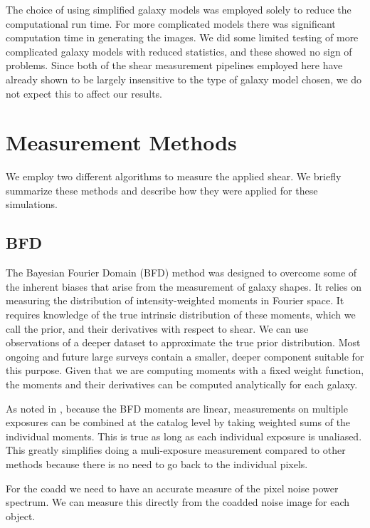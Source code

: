 \documentclass[fleqn,useAMS,usenatbib]{mnras}
\begin{document}
The choice of using simplified galaxy models was employed solely to reduce the computational run time.  For more complicated models there was significant computation time in generating the images.  We did some limited testing of more complicated galaxy models with reduced statistics, and these showed no sign of problems.  Since both of the shear measurement pipelines employed here have already shown to be largely insensitive to the type of galaxy model chosen, we do not expect this to affect our results.


\section{Measurement Methods}
\label{Section:Measurement}
We employ two different algorithms to measure the applied shear.  We briefly summarize these methods and describe how they were applied for these simulations.

\subsection{BFD}
\label{Section:BFD}

The Bayesian Fourier Domain (BFD) method \citep{Bernstein2014,Bernstein2016} was designed to overcome some of the inherent biases that arise from the measurement of galaxy shapes.  It relies on measuring the distribution of intensity-weighted moments in Fourier space.  It requires knowledge of the true intrinsic distribution of these moments, which we call the prior, and their derivatives with respect to shear.  We can use observations of a deeper dataset to approximate the true prior distribution.  Most ongoing and future large surveys contain a smaller, deeper component suitable for this purpose.  Given that we are computing moments with a fixed weight function, the moments and their derivatives can be computed analytically for each galaxy.  

As noted in \citep{Bernstein2016}, because the BFD moments are linear, measurements on multiple exposures can be combined at the catalog level by taking weighted sums of the individual moments.  This is true as long as each individual exposure is unaliased.  This greatly simplifies doing a muli-exposure measurement compared to other methods because there is no need to go back to the individual pixels.  

For the coadd we need to have an accurate measure of the pixel noise power spectrum.  We can measure this directly from the coadded noise image for each object.
\end{document}
